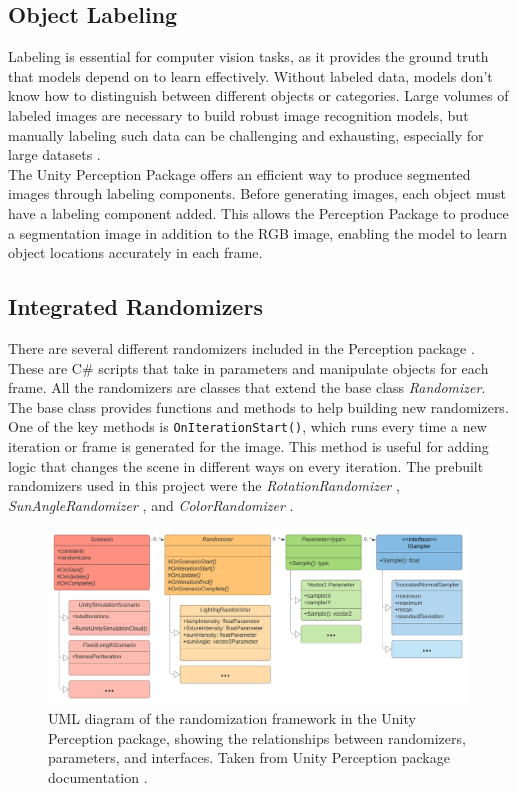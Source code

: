 \subsection{Object Labeling}
Labeling is essential for computer vision tasks, as it provides the ground truth that models depend on to learn effectively. Without labeled data, models don't know how to distinguish between different objects or categories. Large volumes of labeled images are necessary to build robust image recognition models, but manually labeling such data can be challenging and exhausting, especially for large datasets \cite{10.1007/978-3-642-15549-9_55}.\\

\noindent The Unity Perception Package offers an efficient way to produce segmented images through labeling components. Before generating images, each object must have a labeling component added. This allows the Perception Package to produce a segmentation image in addition to the RGB image, enabling the model to learn object locations accurately in each frame.



\subsection{Integrated Randomizers}
\label{section:Integrated Randomizers}
There are several different randomizers included in the Perception package \cite{unity-perception2022}. These are C\# scripts that take in parameters and manipulate objects for each frame. All the randomizers are classes that extend the base class \textit{Randomizer}. The base class provides functions and methods to help building new randomizers. One of the key methods is \texttt{OnIterationStart()}, which runs every time a new iteration or frame is generated for the image. This method is useful for adding logic that changes the scene in different ways on every iteration. The prebuilt randomizers used in this project were the \textit{RotationRandomizer} \cite{rotation_randomizer}, \textit{SunAngleRandomizer} \cite{sun_angle_randomizer}, and \textit{ColorRandomizer} \cite{color_randomizer}.

\begin{figure}[H]
    \centering
    \includegraphics[width=0.99\textwidth]{Figures/randomization_uml.png}
    \caption{UML diagram of the randomization framework in the Unity Perception package, showing the relationships between randomizers, parameters, and interfaces. Taken from Unity Perception package documentation \cite{UMLdiagram}.}
    \label{fig:randomizer class uml}
    
\end{figure}

